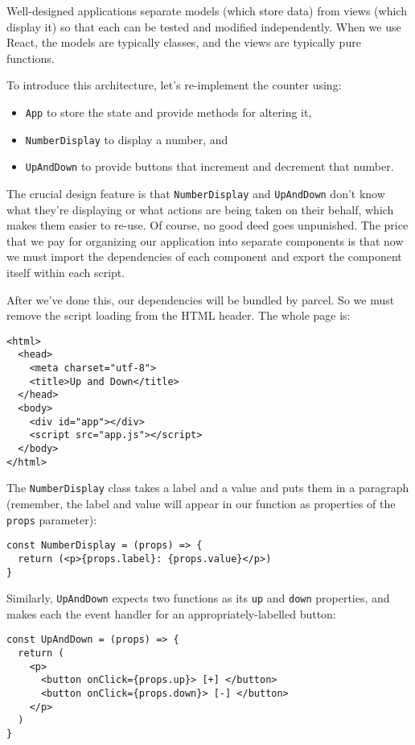 Well-designed applications separate models (which store data)
from views (which display it)
so that each can be tested and modified independently.
When we use React,
the models are typically classes,
and the views are typically pure functions.

To introduce this architecture,
let's re-implement the counter using:

\begin{itemize}
\item
  \texttt{App} to store the state and provide methods for altering it,
\item
  \texttt{NumberDisplay} to display a number, and
\item
  \texttt{UpAndDown} to provide buttons that increment and decrement that number.
\end{itemize}

The crucial design feature is that
\texttt{NumberDisplay} and \texttt{UpAndDown} don't know what they're displaying
or what actions are being taken on their behalf,
which makes them easier to re-use.
Of course,
no good deed goes unpunished.
The price that we pay
for organizing our application into separate components
is that now we must import the dependencies of each component
and export the component itself within each script.

After we've done this,
our dependencies will be bundled by parcel.
So we must remove the script loading from the HTML header.
The whole page is:

\begin{verbatim}
<html>
  <head>
    <meta charset="utf-8">
    <title>Up and Down</title>
  </head>
  <body>
    <div id="app"></div>
    <script src="app.js"></script>
  </body>
</html>
\end{verbatim}

The \texttt{NumberDisplay} class takes a label and a value and puts them in a paragraph
(remember, the label and value will appear in our function as properties of the \texttt{props} parameter):

\begin{verbatim}
const NumberDisplay = (props) => {
  return (<p>{props.label}: {props.value}</p>)
}
\end{verbatim}

\noindent
Similarly,
\texttt{UpAndDown} expects two functions as its \texttt{up} and \texttt{down} properties,
and makes each the event handler for an appropriately-labelled button:

\begin{verbatim}
const UpAndDown = (props) => {
  return (
    <p>
      <button onClick={props.up}> [+] </button>
      <button onClick={props.down}> [-] </button>
    </p>
  )
}
\end{verbatim}

